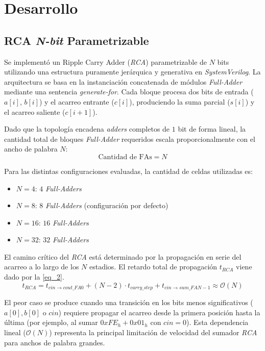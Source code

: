 \documentclass[12pt,a4paper]{article}
\begin{document}
\section{Desarrollo}                                                \label{sec_2}
\subsection{RCA \textit{N-bit} Parametrizable}                      \label{sec_2.1}
Se implementó un Ripple Carry Adder (\textit{RCA}) parametrizable de $N$ bits utilizando una estructura puramente jerárquica y generativa en \textit{SystemVerilog}. La arquitectura se basa en la instanciación concatenada de módulos \textit{Full-Adder} mediante una sentencia \textit{generate-for}. Cada bloque procesa dos bits de entrada ($a[i]$, $b[i]$) y el acarreo entrante ($c[i]$), produciendo la suma parcial ($s[i]$) y el acarreo saliente ($c[i+1]$).

Dado que la topología encadena \textit{adders} completos de $1$ bit de forma lineal, la cantidad total de bloques \textit{Full-Adder} requeridos escala proporcionalmente con el ancho de palabra $N$:
\begin{equation}
    \text{Cantidad de FAs} = N
    \label{eq_1}
\end{equation}

Para las distintas configuraciones evaluadas, la cantidad de celdas utilizadas es:
\begin{itemize}
    \item $N = 4$:  $4$ \textit{Full-Adders}
    \item $N = 8$:  $8$ \textit{Full-Adders} (configuración por defecto)
    \item $N = 16$: $16$ \textit{Full-Adders}
    \item $N = 32$: $32$ \textit{Full-Adders}
\end{itemize}

El camino crítico del \textit{RCA} está determinado por la propagación en serie del acarreo a lo largo de los $N$ estadios. El retardo total de propagación $t_{RCA}$ viene dado por la \autoref{eq_2}. \cite{b1}
\begin{equation}
    t_{RCA} = t_{cin \to cout\_FA0} + (N - 2) \cdot t_{carry\_step} + t_{cin \to sum\_FAN-1} \approx \mathcal{O}(N)
    \label{eq_2}
\end{equation}

El peor caso se produce cuando una transición en los bits menos significativos ($a[0], b[0]$ o $cin$) requiere propagar el acarreo desde la primera posición hasta la última (por ejemplo, al sumar $0xFE_{h} + 0x01_{h}$ con $cin = 0$). Esta dependencia lineal ($\mathcal{O}(N)$) representa la principal limitación de velocidad del sumador \textit{RCA} para anchos de palabra grandes.
\end{document}
